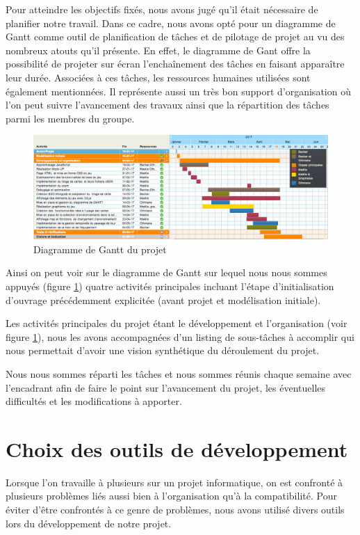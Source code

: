 \documentclass[12pt]{report}
\begin{document}
		Pour atteindre les objectifs fixés, nous avons jugé qu'il était nécessaire de planifier notre travail. Dans ce cadre, nous avons opté pour un diagramme de Gantt comme outil de planification de tâches et de pilotage de projet au vu des nombreux atouts qu’il présente. En effet, le diagramme de Gant offre la possibilité de projeter sur écran l’enchaînement des tâches en faisant apparaître leur durée. Associées à ces tâches, les ressources humaines utilisées sont également mentionnées. Il représente aussi un très bon support d’organisation où l'on peut suivre l’avancement des travaux ainsi que la répartition des tâches parmi les membres du groupe.

		\begin{figure}[h!]
    	\centering
	    \includegraphics[scale=0.4]{images/diagrammeGantt.jpg}
	    \caption{Diagramme de Gantt du projet}
	    \label{fig:diagGantt}
    \end{figure}

		\newpage
		Ainsi on peut voir sur le diagramme de Gantt sur lequel nous nous sommes appuyés (figure \ref{fig:diagGantt}) quatre activités principales incluant l’étape d’initialisation d’ouvrage précédemment explicitée (avant projet et modélisation initiale).

		Les activités principales du projet étant le développement et l'organisation (voir figure \ref{fig:diagGantt}), nous les avons accompagnées d’un listing de sous-tâches à accomplir qui nous permettait d’avoir une vision synthétique du déroulement du projet.

		Nous nous sommes réparti les tâches et nous sommes réunis chaque semaine avec l'encadrant afin de faire le point sur l'avancement du projet, les éventuelles difficultés et les modifications à apporter. 

		\section{Choix des outils de développement}
		Lorsque l’on travaille à plusieurs sur un projet informatique, on est confronté à plusieurs problèmes liés aussi bien à l’organisation qu’à la compatibilité.
		Pour éviter d'être confrontés à ce genre de problèmes, nous avons utilisé divers outils lors du développement de notre projet.
\end{document}

